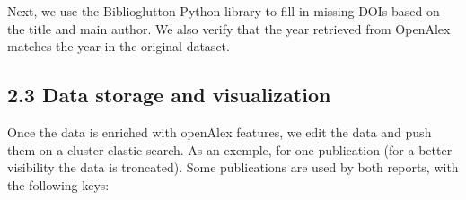 \documentclass[
]{article}
\begin{document}
Next, we use the Biblioglutton Python library to fill in missing DOIs
based on the title and main author. We also verify that the year
retrieved from OpenAlex matches the year in the original dataset.

\hypertarget{data-storage-and-visualization}{%
\subsection{2.3 Data storage and
visualization}\label{data-storage-and-visualization}}

Once the data is enriched with openAlex features, we edit the data and
push them on a cluster elastic-search. As an exemple, for one
publication (for a better visibility the data is troncated). Some
publications are used by both reports, with the following keys:
\end{document}
